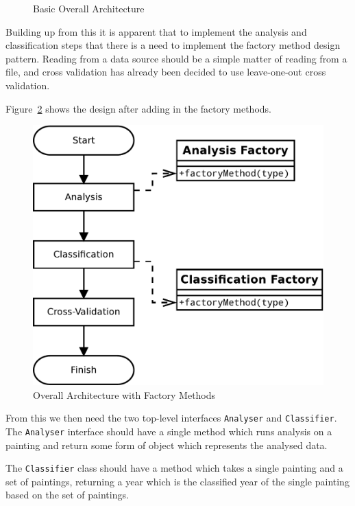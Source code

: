 \begin{figure}[h]
\caption{Basic Overall Architecture}\label{fig:basic-arch}
\end{figure}

Building up from this it is apparent that to implement the analysis and classification steps that 
there is a need to implement the factory method design 
pattern\cite[p.~107-117]{Gamma1996Design}. Reading from a data source should be a simple
matter of reading from a file, and cross validation has already been decided to use leave-one-out
cross validation.

Figure~\ref{fig:factory-arch} shows the design after adding in the factory methods.

\begin{figure}[h]
\centering
\includegraphics[width=\linewidth]{img/factory-arch}
\caption{Overall Architecture with Factory Methods}\label{fig:factory-arch}
\end{figure}

From this we then need the two top-level interfaces \verb+Analyser+ and \verb+Classifier+. The 
\verb+Analyser+ interface should have a single method which runs analysis on a painting and return
some form of object which represents the analysed data.

The \verb+Classifier+ class should have a method which takes a single painting and a set of
paintings, returning a year which is the classified year of the single painting based on the set
of paintings.

